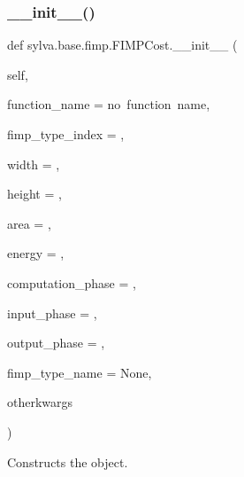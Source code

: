 \subsubsection{\texorpdfstring{\+\_\+\+\_\+init\+\_\+\+\_\+()}{\_\_init\_\_()}}
{\footnotesize\ttfamily def sylva.\+base.\+fimp.\+F\+I\+M\+P\+Cost.\+\_\+\+\_\+init\+\_\+\+\_\+ (\begin{DoxyParamCaption}\item[{}]{self,  }\item[{}]{function\+\_\+name = {\ttfamily \textquotesingle{}no~function~name\textquotesingle{}},  }\item[{}]{fimp\+\_\+type\+\_\+index = {},  }\item[{}]{width = {},  }\item[{}]{height = {},  }\item[{}]{area = {},  }\item[{}]{energy = {},  }\item[{}]{computation\+\_\+phase = {},  }\item[{}]{input\+\_\+phase = {},  }\item[{}]{output\+\_\+phase = {},  }\item[{}]{fimp\+\_\+type\+\_\+name = {\ttfamily None},  }\item[{}]{otherkwargs }\end{DoxyParamCaption})}



Constructs the object. 


